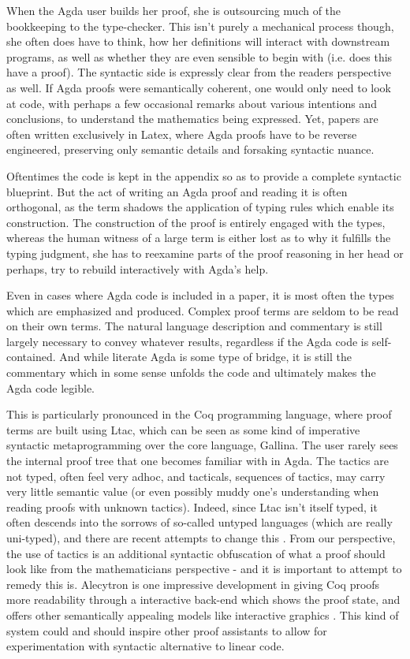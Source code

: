 When the Agda user builds her proof, she is outsourcing much of the bookkeeping
to the type-checker. This isn't purely a mechanical process though, she often
does have to think, how her definitions will interact with downstream programs,
as well as whether they are even sensible to begin with (i.e. does this have a
proof). The syntactic side is expressly clear from the readers perspective as
well. If Agda proofs were semantically coherent, one would only need to look at
code, with perhaps a few occasional remarks about various intentions and
conclusions, to understand the mathematics being expressed. Yet, papers are
often written exclusively in Latex, where Agda proofs have to be reverse
engineered, preserving only semantic details and forsaking syntactic nuance.


Oftentimes the code is kept in the appendix so as to provide a complete
syntactic blueprint. But the act of writing an Agda proof and reading it is
often orthogonal, as the term shadows the application of typing rules
which enable its construction. The construction of the proof is
entirely engaged with the types, whereas the human witness of a large term is
either lost as to why it fulfills the typing judgment, she has to reexamine
parts of the proof reasoning in her head or perhaps, try to rebuild 
interactively with Agda's help.

Even in cases where Agda code is included in a paper, it is most often the types
which are emphasized and produced. Complex proof terms are seldom to be read on
their own terms. The natural language description and commentary is still
largely necessary to convey whatever results, regardless if the Agda code is
self-contained. And while literate Agda is some type of bridge, it is still the
commentary which in some sense unfolds the code and ultimately makes the Agda
code legible.

This is particularly pronounced in the Coq programming language, where proof
terms are built using Ltac, which can be seen as some kind of imperative
syntactic metaprogramming over the core language, Gallina. The user rarely sees
the internal proof tree that one becomes familiar with in Agda. The tactics are
not typed, often feel very adhoc, and tacticals, sequences of tactics, may carry
very little semantic value (or even possibly muddy one's understanding when
reading proofs with unknown tactics). Indeed, since Ltac isn't itself typed, it
often descends into the sorrows of so-called untyped languages (which are really
uni-typed), and there are recent attempts to change this \cite{mtac2}
\cite{ltac2}. From our perspective, the use of tactics is an additional
syntactic obfuscation of what a proof should look like from the mathematicians
perspective - and it is important to attempt to remedy this is. Alecytron is one
impressive development in giving Coq proofs more readability through a
interactive back-end which shows the proof state, and offers other semantically
appealing models like interactive graphics \cite{coqAlec}. This kind of system
could and should inspire other proof assistants to allow for experimentation
with syntactic alternative to linear code.

